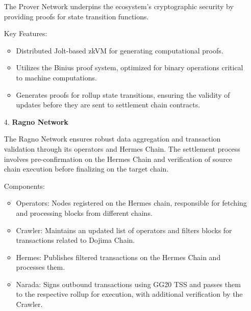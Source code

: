 \begin{itemize}
The Prover Network underpins the ecosystem’s cryptographic security by providing proofs for state transition functions.

Key Features:
    \begin{itemize}
        \item Distributed Jolt-based zkVM for generating computational proofs.
        \item Utilizes the Binius proof system, optimized for binary operations critical to machine computations.
        \item Generates proofs for rollup state transitions, ensuring the validity of updates before they are sent to settlement chain contracts.
    \end{itemize}
    

    \item[4.] \textbf{Ragno Network}

The Ragno Network ensures robust data aggregation and transaction validation through its operators and Hermes Chain. The settlement process involves pre-confirmation on the Hermes Chain and verification of source chain execution before finalizing on the target chain.

Components:
    \begin{itemize}
        \item Operators: Nodes registered on the Hermes chain, responsible for fetching and processing blocks from different chains.
        \item Crawler: Maintains an updated list of operators and filters blocks for transactions related to Dojima Chain.
        \item Hermes: Publishes filtered transactions on the Hermes Chain and processes them.
        \item Narada: Signs outbound transactions using GG20 TSS and passes them to the respective rollup for execution, with additional verification by the Crawler. 
    \end{itemize}
    
\end{itemize} 